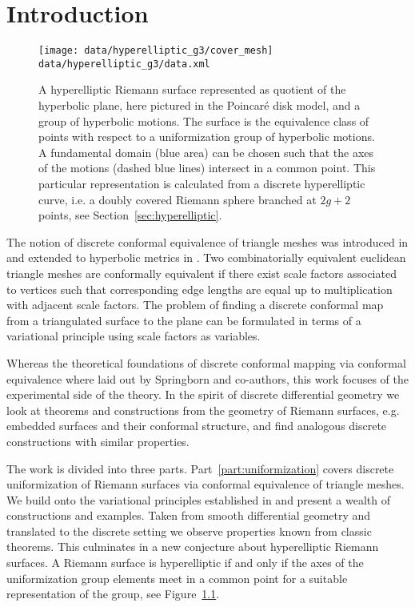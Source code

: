 \documentclass[Thesis.tex]{subfiles}
\begin{document}
\chapter{Introduction}

\begin{figure}
\centering
\texttt{[image: data/hyperelliptic\_g3/cover\_mesh]}\\
{\scriptsize\tt data/hyperelliptic\_g3/data.xml} 
\caption{A hyperelliptic Riemann surface represented as quotient of the hyperbolic plane, here pictured in the Poincar{\'e} disk model, and a group of hyperbolic motions. The surface is the equivalence class of points with respect to a uniformization group of hyperbolic motions. A fundamental domain (blue area) can be chosen such that the axes of the motions (dashed blue lines) intersect in a common point. This particular representation is calculated from a discrete hyperelliptic curve, i.e. a doubly covered Riemann sphere branched at $2g + 2$ points, see Section~\ref{sec:hyperelliptic}.}
\label{fig:regular_cover} 
\end{figure}

The notion of discrete conformal equivalence of triangle meshes was introduced in \cite{Springborn2008} and extended to hyperbolic metrics in \cite{Bobenko2010}. Two combinatorially equivalent euclidean triangle meshes are conformally equivalent if there exist scale factors associated to vertices such that corresponding edge lengths are equal up to multiplication with adjacent scale factors.
The problem of finding a discrete conformal map from a triangulated surface to the plane can be formulated in terms of a variational principle using scale factors as variables. 

Whereas the theoretical foundations of discrete conformal mapping via conformal equivalence where laid out by Springborn and co-authors, this work focuses of the experimental side of the theory. In the spirit of discrete differential geometry we look at theorems and constructions from the geometry of Riemann surfaces, e.g. embedded surfaces and their conformal structure, and find analogous discrete constructions with similar properties.

The work is divided into three parts. Part~\ref{part:uniformization} covers discrete uniformization of Riemann surfaces via conformal equivalence of triangle meshes. We build onto the variational principles established in \cite{Bobenko2010} and present a wealth of constructions and examples. Taken from smooth differential geometry and translated to the discrete setting we observe properties known from classic theorems. This culminates in a new conjecture about hyperelliptic Riemann surfaces. A Riemann surface is hyperelliptic if and only if the axes of the uniformization group elements meet in a common point for a suitable representation of the group, see Figure~\ref{fig:regular_cover}.
\end{document}

